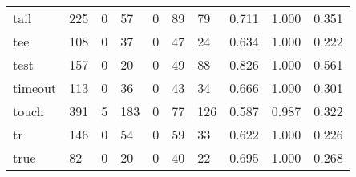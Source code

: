 \begin{longtable}{lp{2.0cm}p{2.0cm}p{2.0cm}p{2.0cm}p{2.0cm}p{2.0cm}p{2.0cm}p{2.0cm}p{2.0cm}}
tail      &                    225 &                                  0 &                                57 &                                0 &                                89 &                              79 &                                0.711 &                                  1.000 &                                0.351 \\
tee       &                    108 &                                  0 &                                37 &                                0 &                                47 &                              24 &                                0.634 &                                  1.000 &                                0.222 \\
test      &                    157 &                                  0 &                                20 &                                0 &                                49 &                              88 &                                0.826 &                                  1.000 &                                0.561 \\
timeout   &                    113 &                                  0 &                                36 &                                0 &                                43 &                              34 &                                0.666 &                                  1.000 &                                0.301 \\
touch     &                    391 &                                  5 &                               183 &                                0 &                                77 &                             126 &                                0.587 &                                  0.987 &                                0.322 \\
tr        &                    146 &                                  0 &                                54 &                                0 &                                59 &                              33 &                                0.622 &                                  1.000 &                                0.226 \\
true      &                     82 &                                  0 &                                20 &                                0 &                                40 &                              22 &                                0.695 &                                  1.000 &                                0.268 \\

\end{longtable}
